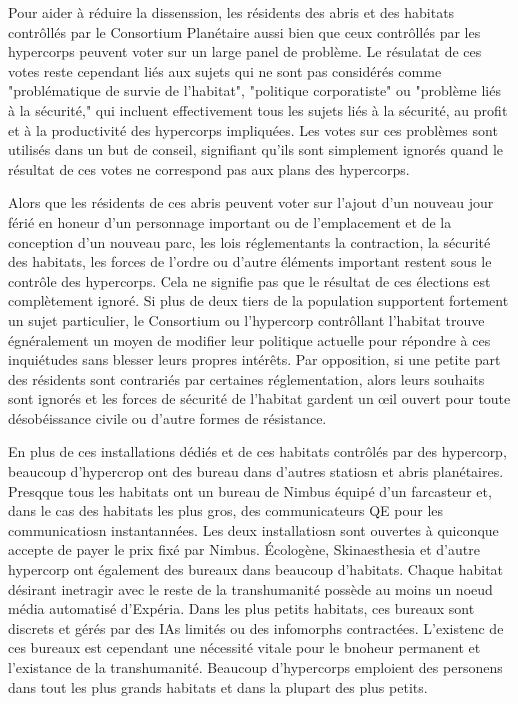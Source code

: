                Pour aider à réduire la dissenssion, les résidents des abris et des habitats contrôllés par le Consortium Planétaire aussi bien que ceux contrôllés par les hypercorps peuvent voter sur un large panel de problème. Le résulatat de ces votes reste cependant liés aux sujets qui ne sont pas considérés comme "problématique de survie de l'habitat", "politique corporatiste" ou "problème liés à la sécurité," qui incluent effectivement tous les sujets liés à la sécurité, au profit et à la productivité des hypercorps impliquées. Les votes sur ces problèmes sont utilisés dans un but de conseil, signifiant qu'ils sont simplement ignorés quand le résultat de ces votes ne correspond pas aux plans des hypercorps. 

               Alors que les résidents de ces abris peuvent voter sur l'ajout d'un nouveau jour férié en honeur d'un personnage important ou de l'emplacement et de la conception d'un nouveau parc, les lois réglementants la contraction, la sécurité des habitats, les forces de l'ordre ou d'autre éléments important restent sous le contrôle des hypercorps. Cela ne signifie pas que le résultat de ces élections est complètement ignoré. Si plus de deux tiers de la population supportent fortement un sujet particulier, le Consortium ou l'hypercorp contrôllant l'habitat trouve égnéralement un moyen de modifier leur politique actuelle pour répondre à ces inquiétudes sans blesser leurs propres intérêts. Par opposition, si une petite part des résidents sont contrariés par certaines réglementation, alors leurs souhaits sont ignorés et les forces de sécurité de l'habitat gardent un œil ouvert pour toute désobéissance civile ou d'autre formes de résistance. 

               En plus de ces installations dédiés et de ces habitats contrôlés par des hypercorp, beaucoup d'hypercrop ont des bureau dans d'autres statiosn et abris planétaires. Presqque tous les habitats ont un bureau de Nimbus équipé d'un farcasteur et, dans le cas des habitats les plus gros, des communicateurs QE pour les communicatiosn instantannées. Les deux installatiosn sont ouvertes à quiconque accepte de payer le prix fixé par Nimbus. Écologène, Skinaesthesia et d'autre hypercorp ont également des bureaux dans beaucoup d'habitats. Chaque habitat désirant inetragir avec le reste de la transhumanité possède au moins un noeud média automatisé d'Expéria. Dans les plus petits habitats, ces bureaux sont discrets et gérés par des IAs limités ou des infomorphs contractées. L'existenc de ces bureaux est cependant une nécessité vitale pour le bnoheur permanent et l'existance de la transhumanité. Beaucoup d'hypercorps emploient des personens dans tout les plus grands habitats et dans la plupart des plus petits. 

